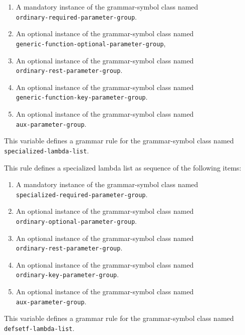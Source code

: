 \begin{enumerate}
\item A mandatory instance of the grammar-symbol class named\\
  \texttt{ordinary-required-parameter-group}.
\item An optional instance of the grammar-symbol class named\\
\texttt{generic-function-optional-parameter-group},
\item An optional instance of the grammar-symbol class named\\
\texttt{ordinary-rest-parameter-group}.
\item An optional instance of the grammar-symbol class named\\
\texttt{generic-function-key-parameter-group}.
\item An optional instance of the grammar-symbol class named\\
\texttt{aux-parameter-group}.
\end{enumerate}


This variable defines a grammar rule for the grammar-symbol class
named \texttt{specialized-lambda-list}.

This rule defines a specialized lambda list as sequence of the
following items:

\begin{enumerate}
\item A mandatory instance of the grammar-symbol class named\\
  \texttt{specialized-required-parameter-group}.
\item An optional instance of the grammar-symbol class named\\
  \texttt{ordinary-optional-parameter-group}.
\item An optional instance of the grammar-symbol class named\\
\texttt{ordinary-rest-parameter-group}.
\item An optional instance of the grammar-symbol class named\\
\texttt{ordinary-key-parameter-group}.
\item An optional instance of the grammar-symbol class named\\
\texttt{aux-parameter-group}.
\end{enumerate}

This variable defines a grammar rule for the grammar-symbol class
named \texttt{defsetf-lambda-list}.

